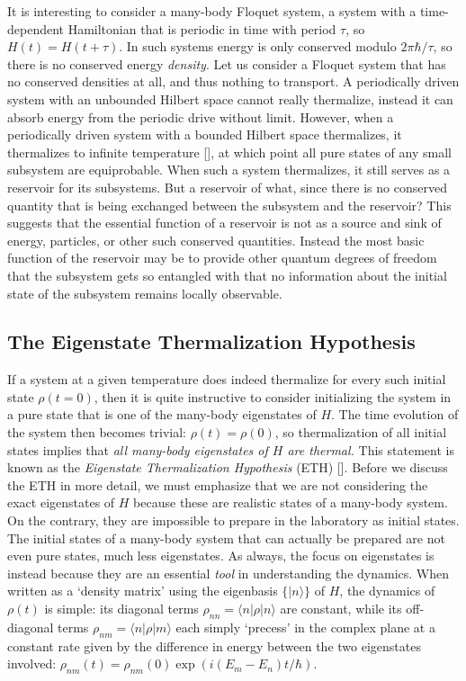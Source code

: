 \documentclass[amsmath,onecolumn, superscriptaddress,preprint,aps]{revtex4}
\renewcommand{\cite}[1]{[\onlinecite{#1}]}
\begin{document}
It is interesting to consider a many-body Floquet system, a system with a time-dependent Hamiltonian that is periodic in time with period $\tau$, so $H(t)=H(t+\tau)$.
In such systems energy is only conserved modulo $2\pi\hbar/\tau$, so there is no conserved energy {\it density}.  Let us consider a Floquet system that has no
conserved densities at all, and thus nothing to transport.  A periodically driven system with an unbounded Hilbert space cannot really thermalize, instead it can absorb energy from the periodic drive without limit.  However, when a periodically driven system with a bounded Hilbert space thermalizes, it thermalizes to infinite temperature \cite{Floquet2}, at which point all pure states of any small subsystem are equiprobable.
When such a system thermalizes, it still serves as a reservoir for its subsystems.  But a reservoir of what,
since there is no conserved quantity that is being exchanged between the subsystem and the reservoir?  This suggests that the essential function of a reservoir is
not as a source and sink of energy, particles, or other such conserved quantities.  Instead the most basic function of the reservoir may be to provide other quantum
degrees of freedom that the subsystem gets so entangled with that no information about the initial state of the subsystem remains locally observable.

\subsection{The Eigenstate Thermalization Hypothesis}\label{ETH}

If a system at a given temperature does indeed thermalize for every such initial state $\rho(t=0)$, then it is quite instructive to consider initializing
the system in a pure state that is one of the many-body eigenstates of $H$.  The time evolution of the system then becomes trivial: $\rho(t) = \rho(0)$,
so thermalization of all initial states implies that {\it all many-body eigenstates of $H$ are thermal.}
This statement is known as the {\it Eigenstate Thermalization Hypothesis} (ETH) \cite{Deutsch, Srednicki,tasaki, Rigol}.
Before we discuss the ETH in more detail, we must emphasize that we are not considering the exact eigenstates of $H$ because these are realistic states of a many-body system.  On the contrary, they are impossible to prepare in the laboratory as initial states.  The initial states of a many-body system that can actually be prepared are not even pure states, much less eigenstates.  As always, the focus on eigenstates is instead because they are an essential {\it tool} in understanding the dynamics.  When written as a `density matrix' using the eigenbasis $\{|n\rangle\}$ of $H$, the dynamics of $\rho(t)$ is simple: its diagonal terms $\rho_{nn}=\langle n|\rho|n\rangle$ are constant, while its off-diagonal terms $\rho_{nm}=\langle n|\rho|m\rangle$ each simply `precess' in the complex plane at a constant rate given by the difference in energy between the two eigenstates involved: $\rho_{nm}(t)=\rho_{nm}(0)\exp{(i(E_m-E_n)t/\hbar)}$.
\end{document}
